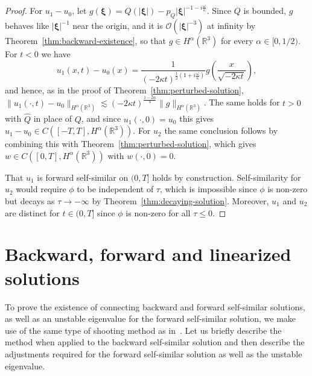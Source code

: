 \documentclass[11pt]{article}
\begin{document}
\begin{proof}
  For \(u_{1} - u_{0}\), let
  \(g(\bm{\xi}) = Q(|\bm{\xi}|) - p_{Q}|\bm{\xi}|^{-1 -
    i\frac{\omega}{\kappa}}\). Since \(Q\) is bounded, \(g\) behaves
  like \(|\bm{\xi}|^{-1}\) near the origin, and it is
  \(\mathcal{O}(|\bm{\xi}|^{-3})\) at infinity by
  Theorem~\ref{thm:backward-existence}, so that
  \(g \in H^{\alpha}(\mathbb{R}^{3})\) for every
  \(\alpha \in [0, 1/2)\). For \(t < 0\) we have
  \begin{equation*}
    u_{1}(x, t) - u_{0}(x)
    = \frac{1}{(-2\kappa t)^{\frac{1}{2}\left(1 + i\frac{\omega}{\kappa}\right)}}
    g\left(\frac{x}{\sqrt{-2\kappa t}}\right),
  \end{equation*}
  and hence, as in the proof of Theorem~\ref{thm:perturbed-solution},
  \(\|u_{1}(\cdot, t) - u_{0}\|_{H^{\alpha}(\mathbb{R}^{3})} \lesssim
  (-2\kappa t)^{\frac{1 -
      2\alpha}{4}}\|g\|_{H^{\alpha}(\mathbb{R}^{3})}\). The same holds
  for \(t > 0\) with \(\hat{Q}\) in place of \(Q\), and since
  \(u_{1}(\cdot, 0) = u_{0}\) this gives
  \(u_{1} - u_{0} \in C([-T, T], H^{\alpha}(\mathbb{R}^{3}))\). For
  \(u_{2}\) the same conclusion follows by combining this with
  Theorem~\ref{thm:perturbed-solution}, which gives
  \(w \in C([0, T], H^{\alpha}(\mathbb{R}^{3}))\) with
  \(w(\cdot, 0) = 0\).

  That \(u_{1}\) is forward self-similar on \((0, T]\) holds by
  construction. Self-similarity for \(u_{2}\) would require \(\phi\)
  to be independent of \(\tau\), which is impossible since \(\phi\) is
  non-zero but decays as \(\tau \to -\infty\) by
  Theorem~\ref{thm:decaying-solution}. Moreover, \(u_{1}\) and
  \(u_{2}\) are distinct for \(t \in (0, T]\) since \(\phi\) is
  non-zero for all \(\tau \leq 0\).
\end{proof}

\section{Backward, forward and linearized solutions}
\label{sec:backward-forward-linearized-solutions}

To prove the existence of connecting backward and forward self-similar
solutions, as well as an unstable eigenvalue for the forward
self-similar solution, we make use of the same type of shooting method
as in~\cite{Dahne2024}. Let us briefly describe the method when
applied to the backward self-similar solution and then describe the
adjustments required for the forward self-similar solution as well as
the unstable eigenvalue.
\end{document}
